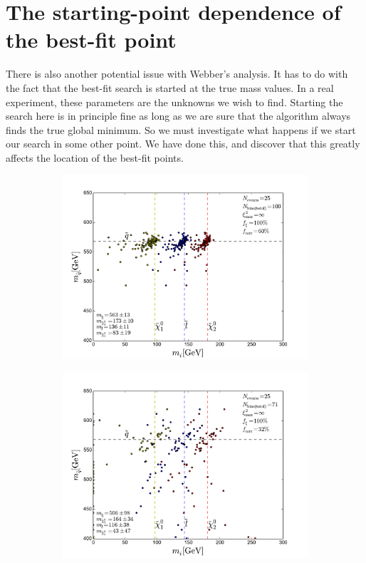 \documentclass[twoside,english]{uiofysmaster}
\begin{document}
\section{The starting-point dependence of the best-fit point}
\label{sec:SP-dependence_webber}
There is also another potential issue with Webber's analysis. It has to do with the fact that the best-fit search is started at the true mass values.  In a real experiment, these parameters are the unknowns we wish to find. Starting the search here is in principle fine as long as we are sure that the algorithm always finds the true global minimum. So we must investigate what happens if we start our search in some other point. We have done this, and discover that this greatly affects the location of the best-fit points.
\begin{figure}[hbt]
	\centering
	\begin{subfigure}[b]{0.45\textwidth}
		\includegraphics[width=\textwidth]{figures/webber_rec_table/webber_HW-rec_nocut.pdf} 
		\caption{ }
	\end{subfigure}
	\begin{subfigure}[b]{0.45\textwidth}
		\includegraphics[width=\textwidth]{figures/webber_rec_table/webber-rec_wrong_starting_point-400-300-200-100_lowtol.pdf}
		\caption{ } 
	\end{subfigure}


\end{figure}
\end{document}
